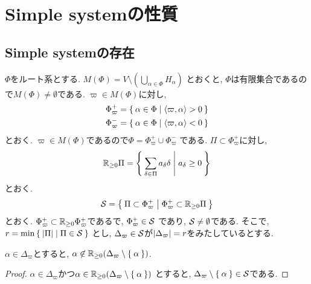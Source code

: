 \chapter{Simple systemの性質}
\section{Simple systemの存在}
$\Phi$をルート系とする.
$M(\Phi)=V \setminus (\bigcup_{\alpha\in\Phi}H_\alpha)$
とおくと,
$\Phi$は有限集合であるので$M(\Phi)\neq \emptyset$である.
$\varpi\in M(\Phi)$に対し,
\begin{align*}
  \Phi_{\varpi}^+&=\Set{\alpha\in\Phi|\Braket{\varpi,\alpha}>0}\\
  \Phi_{\varpi}^-&=\Set{\alpha\in\Phi|\Braket{\varpi,\alpha}<0}
\end{align*}
とおく.
$\varpi\in M(\Phi)$であるので$\Phi=\Phi_{\varpi}^+\cup \Phi_{\varpi}^-$
である.
$\Pi\subset \Phi_{\varpi}^+$に対し,
\begin{align*}
  \mathbb{R}_{\geq 0}\Pi =
  \Set{\sum_{\delta\in\Pi}a_\delta \delta|a_\delta \geq 0}
\end{align*}
とおく.
\begin{align*}
  \mathcal{S} =
  \Set{\Pi\subset \Phi_{\varpi}^+|\Phi_{\varpi}^+\subset \mathbb{R}_{\geq 0}\Pi}
\end{align*}
とおく.
$\Phi_{\varpi}^+\subset \mathbb{R}_{\geq 0}\Phi_{\varpi}^+$であるで,
$\Phi_{\varpi}^+\in\mathcal{S}$
であり, $\mathcal{S}\neq\emptyset$である.
そこで, $r=\min\Set{\left|\Pi\right||\Pi\in\mathcal{S}}$
とし, $\Delta_{\varpi}\in\mathcal{S}$が$\left|\Delta_{\varpi}\right|=r$をみたしているとする.
\begin{lemma}
  \label{lem:simple:posiindp}
  $\alpha\in \Delta_{\varpi}$とすると,
  $\alpha\not\in\mathbb{R}_{\geq 0}(\Delta_{\varpi}\setminus\Set{\alpha})$.
\end{lemma}
\begin{proof}
  $\alpha\in \Delta_{\varpi}$かつ$\alpha\in\mathbb{R}_{\geq 0}(\Delta_{\varpi}\setminus\Set{\alpha})$
  とすると, $\Delta_{\varpi}\setminus\Set{\alpha}\in\mathcal{S}$である.
\end{proof}

